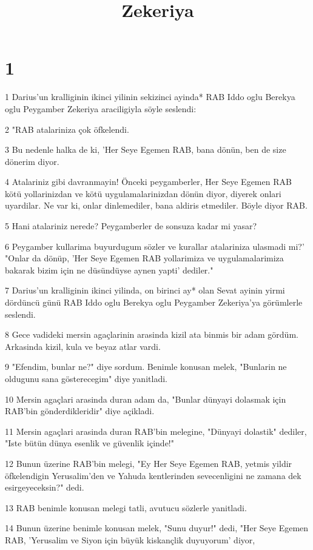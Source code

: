

\title{Zekeriya}


\chapter{1}

\par 1 Darius'un kralliginin ikinci yilinin sekizinci ayinda* RAB Iddo oglu Berekya oglu Peygamber Zekeriya araciligiyla söyle seslendi:
\par 2 "RAB atalariniza çok öfkelendi.
\par 3 Bu nedenle halka de ki, 'Her Seye Egemen RAB, bana dönün, ben de size dönerim diyor.
\par 4 Atalariniz gibi davranmayin! Önceki peygamberler, Her Seye Egemen RAB kötü yollarinizdan ve kötü uygulamalarinizdan dönün diyor, diyerek onlari uyardilar. Ne var ki, onlar dinlemediler, bana aldiris etmediler. Böyle diyor RAB.
\par 5 Hani atalariniz nerede? Peygamberler de sonsuza kadar mi yasar?
\par 6 Peygamber kullarima buyurdugum sözler ve kurallar atalariniza ulasmadi mi?' "Onlar da dönüp, 'Her Seye Egemen RAB yollarimiza ve uygulamalarimiza bakarak bizim için ne düsündüyse aynen yapti' dediler."
\par 7 Darius'un kralliginin ikinci yilinda, on birinci ay* olan Sevat ayinin yirmi dördüncü günü RAB Iddo oglu Berekya oglu Peygamber Zekeriya'ya görümlerle seslendi.
\par 8 Gece vadideki mersin agaçlarinin arasinda kizil ata binmis bir adam gördüm. Arkasinda kizil, kula ve beyaz atlar vardi.
\par 9 "Efendim, bunlar ne?" diye sordum. Benimle konusan melek, "Bunlarin ne oldugunu sana gösterecegim" diye yanitladi.
\par 10 Mersin agaçlari arasinda duran adam da, "Bunlar dünyayi dolasmak için RAB'bin gönderdikleridir" diye açikladi.
\par 11 Mersin agaçlari arasinda duran RAB'bin melegine, "Dünyayi dolastik" dediler, "Iste bütün dünya esenlik ve güvenlik içinde!"
\par 12 Bunun üzerine RAB'bin melegi, "Ey Her Seye Egemen RAB, yetmis yildir öfkelendigin Yerusalim'den ve Yahuda kentlerinden sevecenligini ne zamana dek esirgeyeceksin?" dedi.
\par 13 RAB benimle konusan melegi tatli, avutucu sözlerle yanitladi.
\par 14 Bunun üzerine benimle konusan melek, "Sunu duyur!" dedi, "Her Seye Egemen RAB, 'Yerusalim ve Siyon için büyük kiskançlik duyuyorum' diyor,
